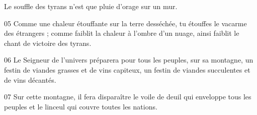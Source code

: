 Le souffle des tyrans n’est que pluie d’orage sur un mur.

05 Comme une chaleur étouffante sur la terre desséchée, tu étouffes le vacarme des étrangers ; comme faiblit la chaleur à l’ombre d’un nuage, ainsi faiblit le chant de victoire des tyrans.

06 Le Seigneur de l’univers préparera pour tous les peuples, sur sa montagne, un festin de viandes grasses et de vins capiteux, un festin de viandes succulentes et de vins décantés.

07 Sur cette montagne, il fera disparaître le voile de deuil qui enveloppe tous les peuples et le linceul qui couvre toutes les nations.
